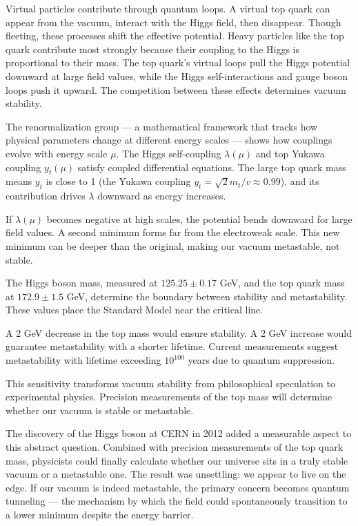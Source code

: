 Virtual particles contribute through quantum loops. A virtual top quark can appear from the vacuum, interact with the Higgs field, then disappear. Though fleeting, these processes shift the effective potential. Heavy particles like the top quark contribute most strongly because their coupling to the Higgs is proportional to their mass. The top quark's virtual loops pull the Higgs potential downward at large field values, while the Higgs self-interactions and gauge boson loops push it upward. The competition between these effects determines vacuum stability.

The renormalization group — a mathematical framework that tracks how physical parameters change at different energy scales — shows how couplings evolve with energy scale $\mu$. The Higgs self-coupling $\lambda(\mu)$ and top Yukawa coupling $y_t(\mu)$ satisfy coupled differential equations. The large top quark mass means $y_t$ is close to 1 (the Yukawa coupling $y_t = \sqrt{2}m_t/v \approx 0.99$), and its contribution drives $\lambda$ downward as energy increases.

If $\lambda(\mu)$ becomes negative at high scales, the potential bends downward for large field values. A second minimum forms far from the electroweak scale. This new minimum can be deeper than the original, making our vacuum metastable, not stable.

The Higgs boson mass, measured at $125.25 \pm 0.17$ GeV, and the top quark mass at $172.9 \pm 1.5$ GeV, determine the boundary between stability and metastability. These values place the Standard Model near the critical line.

A 2 GeV decrease in the top mass would ensure stability. A 2 GeV increase would guarantee metastability with a shorter lifetime. Current measurements suggest metastability with lifetime exceeding $10^{100}$ years due to quantum suppression.

This sensitivity transforms vacuum stability from philosophical speculation to experimental physics. Precision measurements of the top mass will determine whether our vacuum is stable or metastable.

The discovery of the Higgs boson at CERN in 2012 added a measurable aspect to this abstract question. Combined with precision measurements of the top quark mass, physicists could finally calculate whether our universe sits in a truly stable vacuum or a metastable one. The result was unsettling: we appear to live on the edge. If our vacuum is indeed metastable, the primary concern becomes quantum tunneling — the mechanism by which the field could spontaneously transition to a lower minimum despite the energy barrier.

